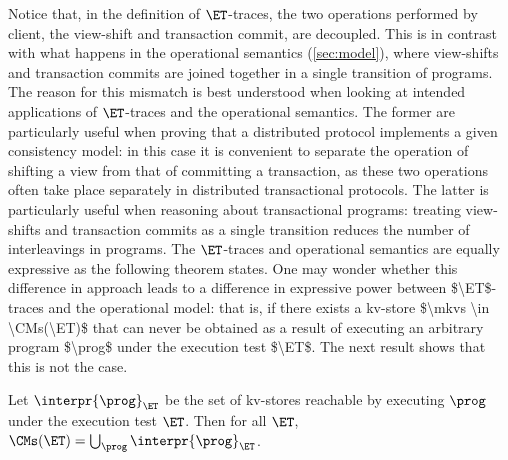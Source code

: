 Notice that, in the definition of $\ET$-traces, the two operations
performed by client, the view-shift and 
transaction commit, are decoupled. This is in contrast with what
happens in the operational semantics (\cref{sec:model}), 
where view-shifts and transaction commits are joined  together in a single transition of programs. 
The reason for this mismatch is best understood when looking at intended applications of 
$\ET$-traces and the operational semantics. The former are particularly useful when proving that a distributed 
protocol implements a given consistency model: in this case it is convenient to separate the operation of shifting a view from that of committing a transaction, 
as these two operations often take place separately in distributed transactional protocols. The latter is particularly useful when reasoning about transactional 
programs: treating view-shifts and transaction commits as a single transition reduces the number of interleavings in programs.
The $\ET$-traces and operational semantics are equally expressive as
the following theorem states. 
\ac{One may wonder whether this difference in approach leads to a difference in expressive power between $\ET$-traces 
and the operational model: that is, if there exists a kv-store $\mkvs \in \CMs(\ET)$ that can never be obtained as a 
result of executing an arbitrary program $\prog$ under the execution test $\ET$. The next result shows that 
this is not the case.}
%

\begin{theorem}
	Let $\interpr{\prog}_{\ET}$ be the set of kv-stores reachable by executing $\prog$ under the execution test $\ET$. 
    Then for all $\ET$, $\CMs(\ET) = \bigcup_{\prog} \interpr{\prog}_{\ET}$.
\end{theorem}

